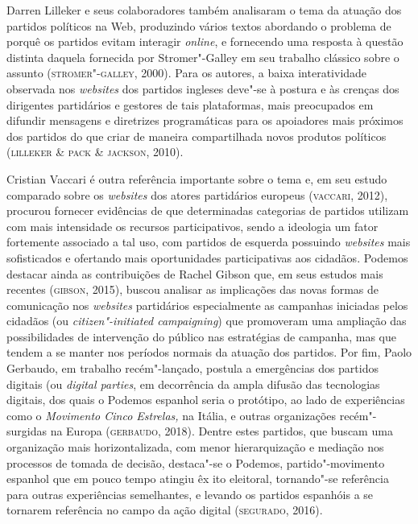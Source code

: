 Darren Lilleker e seus colaboradores também analisaram o tema da atuação
dos partidos políticos na Web, produzindo vários textos abordando o
problema de porquê os partidos evitam interagir \textit{online}, e fornecendo uma
resposta à questão distinta daquela fornecida por Stromer"-Galley em seu
trabalho clássico sobre o assunto (\textsc{stromer"-galley}, 2000). Para os
autores, a baixa interatividade observada nos \textit{websites} dos partidos
ingleses deve"-se à postura e às crenças dos dirigentes partidários e
gestores de tais plataformas, mais preocupados em difundir mensagens e
diretrizes programáticas para os apoiadores mais próximos dos partidos
do que criar de maneira compartilhada novos produtos políticos (\textsc{lilleker}
\& \textsc{pack} \& \textsc{jackson}, 2010).

Cristian Vaccari é outra referência importante sobre o tema e, em seu
estudo comparado sobre os \textit{websites} dos atores partidários europeus
(\textsc{vaccari}, 2012), procurou fornecer evidências de que determinadas
categorias de partidos utilizam com mais intensidade os recursos
participativos, sendo a ideologia um fator fortemente associado a tal
uso, com partidos de esquerda possuindo \textit{websites} mais sofisticados e
ofertando mais oportunidades participativas aos cidadãos. Podemos
destacar ainda as contribuições de Rachel Gibson que, em seus estudos
mais recentes (\textsc{gibson}, 2015), buscou analisar as implicações das novas
formas de comunicação nos \textit{websites} partidários especialmente as
campanhas iniciadas pelos cidadãos (ou \textit{citizen"-initiated campaigning})
que promoveram uma ampliação das possibilidades de intervenção do
público nas estratégias de campanha, mas que tendem a se manter nos
períodos normais da atuação dos partidos. Por fim, Paolo Gerbaudo, em
trabalho recém"-lançado, postula a emergências dos partidos
digitais (ou \textit{digital parties}, em decorrência da ampla difusão das
tecnologias digitais, dos quais o Podemos espanhol seria o
protótipo, ao lado de experiências como o \textit{Movimento Cinco
Estrelas,} na Itália, e outras organizações recém"-surgidas na Europa
(\textsc{gerbaudo}, 2018). Dentre estes partidos, que buscam uma organização mais
horizontalizada, com menor hierarquização e mediação nos processos de
tomada de decisão, destaca"-se o Podemos, partido"-movimento espanhol que
em pouco tempo atingiu êx ito eleitoral, tornando"-se referência para
outras experiências semelhantes, e levando os partidos espanhóis a se
tornarem referência no campo da ação digital (\textsc{segurado}, 2016).

